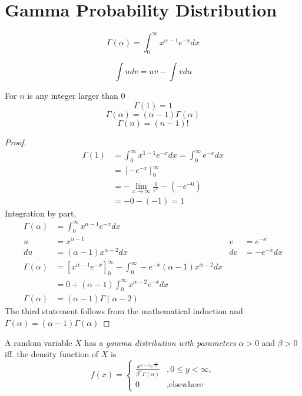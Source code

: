 \section{Gamma Probability Distribution}

\begin{definition}
    \[
    \Gamma(\alpha) = \int^\infty_0 x^{\alpha - 1} e^{-x} dx    
    \]
\end{definition}

\begin{theorem}
    \[
    \int u dv = uv - \int v du    
    \]
\end{theorem}

\begin{theorem} For $n$ is any integer larger than 0
    \[\Gamma(1) = 1 \]
    \[\Gamma(\alpha) = (\alpha -1 )\Gamma(\alpha) \]
    \[\Gamma(n) = (n-1)! \]
\end{theorem}

\begin{proof}
    \begin{align*}
        \Gamma(1) &= \int^\infty_0 x^{1 - 1} e^{-x} dx
            = \int^\infty_0 e^{-x} dx \\
            &= \left[-e^{-x}\right]^\infty_0 \\
            &= -\lim_{x \rightarrow \infty} \frac{1}{e^x}  - (-e^{-0}) \\
            &= - 0 - (- 1) = 1
    \end{align*}
    Integration by part,
    \begin{align*}
        \Gamma(\alpha) 
        &=  \int^\infty_0 x^{\alpha - 1} e^{-x} dx \\
         u  &= x^{\alpha - 1}    & v &= e^{-x} \\
         du &= (\alpha - 1)x^{\alpha - 2} dx & dv &= -e^{-x} dx \\
        \Gamma(\alpha) 
        &=  \left[x^{\alpha - 1} e^{-x} \right]^\infty_0 
            - \int^\infty_0 -e^{-x}  (\alpha - 1)x^{\alpha - 2} dx \\
        &= 0 + (\alpha - 1) \int^\infty_0 x^{\alpha - 2}  e^{-x}  dx \\
        \Gamma(\alpha)  &= (\alpha - 1)\Gamma(\alpha - 2)
    \end{align*}
    The third statement follows from the mathematical induction and  $\Gamma(\alpha) = (\alpha -1 )\Gamma(\alpha)$
\end{proof}

\begin{definition}
    A random variable $X$ has a \emph{gamma distribution with parameters} 
    $\alpha > 0$ and $\beta > 0$ iff. the density function of $X$ is
    \[
        f(x) =
        \begin{cases}
        \frac{x^{\alpha - 1}e^{\frac{-x}{\beta}}}{\beta^\alpha\Gamma(\alpha)} &, 0 \leq y < \infty,\\
        0&, \text{elsewhere}
        \end{cases} 
    \]
\end{definition}

